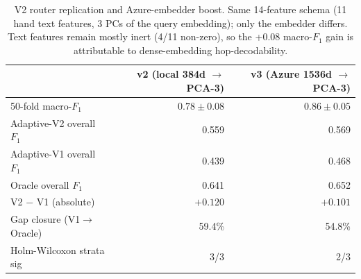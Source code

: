 \begin{table}[t]
  \centering
  \caption{V2 router replication and Azure-embedder boost. Same 14-feature schema (11 hand text features, 3 PCs of the query embedding); only the embedder differs. Text features remain mostly inert (4/11 non-zero), so the +0.08 macro-$F_1$ gain is attributable to dense-embedding hop-decodability.}
  \label{tab:router}
  \small
  \begin{tabular}{l rr}
    \toprule
     & v2 (local 384d $\to$ PCA-3) & v3 (Azure 1536d $\to$ PCA-3) \\
    \midrule
    50-fold macro-$F_1$ & $0.78 \pm 0.08$ & $\mathbf{0.86 \pm 0.05}$ \\
    Adaptive-V2 overall $F_1$ & 0.559 & 0.569 \\
    Adaptive-V1 overall $F_1$ & 0.439 & 0.468 \\
    Oracle overall $F_1$ & 0.641 & 0.652 \\
    V2 $-$ V1 (absolute) & $+0.120$ & $+0.101$ \\
    Gap closure (V1$\to$Oracle) & 59.4\% & 54.8\% \\
    Holm-Wilcoxon strata sig & 3/3 & 2/3 \\
    \bottomrule
  \end{tabular}
\end{table}
